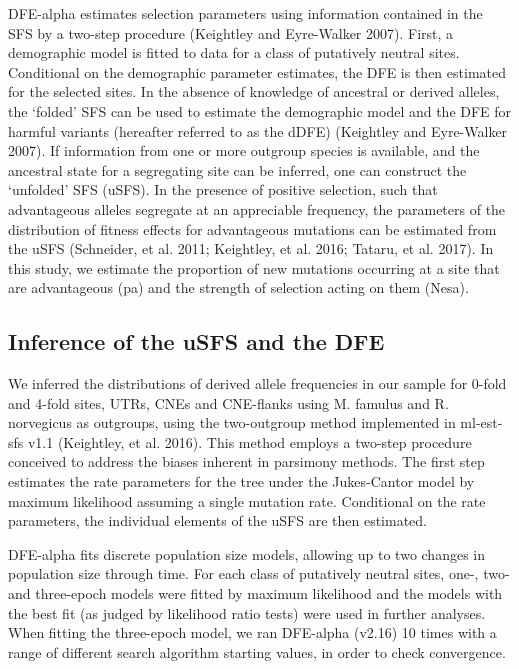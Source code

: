 	DFE-alpha estimates selection parameters using information contained in the SFS by a two-step procedure (Keightley and Eyre-Walker 2007). First, a demographic model is fitted to data for a class of putatively neutral sites. Conditional on the demographic parameter estimates, the DFE is then estimated for the selected sites. In the absence of knowledge of ancestral or derived alleles, the ‘folded’ SFS can be used to estimate the demographic model and the DFE for harmful variants (hereafter referred to as the dDFE) (Keightley and Eyre-Walker 2007). If information from one or more outgroup species is available, and the ancestral state for a segregating site can be inferred, one can construct the ‘unfolded’ SFS (uSFS). In the presence of positive selection, such that advantageous alleles segregate at an appreciable frequency, the parameters of the distribution of fitness effects for advantageous mutations can be estimated from the uSFS (Schneider, et al. 2011; Keightley, et al. 2016; Tataru, et al. 2017). In this study, we estimate the proportion of new mutations occurring at a site that are advantageous (pa) and the strength of selection acting on them (Nesa).

\subsection{Inference of the uSFS and the DFE}
 
We inferred the distributions of derived allele frequencies in our sample for 0-fold and 4-fold sites, UTRs, CNEs and CNE-flanks using M. famulus and R. norvegicus as outgroups, using the two-outgroup method implemented in ml-est-sfs v1.1 (Keightley, et al. 2016). This method employs a two-step procedure conceived to address the biases inherent in parsimony methods. The first step estimates the rate parameters for the tree under the Jukes-Cantor model by maximum likelihood assuming a single mutation rate. Conditional on the rate parameters, the individual elements of the uSFS are then estimated.
 
DFE-alpha fits discrete population size models, allowing up to two changes in population size through time. For each class of putatively neutral sites, one-, two- and three-epoch models were fitted by maximum likelihood and the models with the best fit (as judged by likelihood ratio tests) were used in further analyses. When fitting the three-epoch model, we ran DFE-alpha (v2.16) 10 times with a range of different search algorithm starting values, in order to check convergence.

